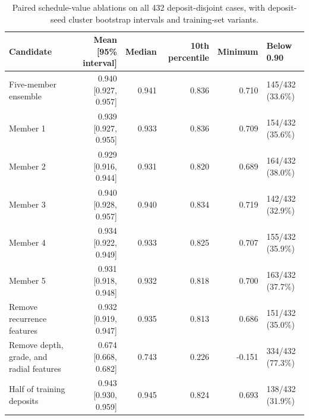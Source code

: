\begin{table}[!htbp]
\centering
\footnotesize
\setlength{\tabcolsep}{2pt}
\caption{Paired schedule-value ablations on all 432 deposit-disjoint cases, with deposit-seed cluster bootstrap intervals and training-set variants.}
\label{tab:expected-time-ablations}
\begin{tabular}{lrrrrl}
\toprule
Candidate & Mean [95\% interval] & Median & 10th percentile & Minimum & Below 0.90 \\
\midrule
Five-member ensemble & 0.940 [0.927, 0.957] & 0.941 & 0.836 & 0.710 & 145/432 (33.6\%) \\
Member 1 & 0.939 [0.927, 0.955] & 0.933 & 0.836 & 0.709 & 154/432 (35.6\%) \\
Member 2 & 0.929 [0.916, 0.944] & 0.931 & 0.820 & 0.689 & 164/432 (38.0\%) \\
Member 3 & 0.940 [0.928, 0.957] & 0.940 & 0.834 & 0.719 & 142/432 (32.9\%) \\
Member 4 & 0.934 [0.922, 0.949] & 0.933 & 0.825 & 0.707 & 155/432 (35.9\%) \\
Member 5 & 0.931 [0.918, 0.948] & 0.932 & 0.818 & 0.700 & 163/432 (37.7\%) \\
Remove recurrence features & 0.932 [0.919, 0.947] & 0.935 & 0.813 & 0.686 & 151/432 (35.0\%) \\
Remove depth, grade, and radial features & 0.674 [0.668, 0.682] & 0.743 & 0.226 & -0.151 & 334/432 (77.3\%) \\
Half of training deposits & 0.943 [0.930, 0.959] & 0.945 & 0.824 & 0.693 & 138/432 (31.9\%) \\
\bottomrule
\end{tabular}
\end{table}
